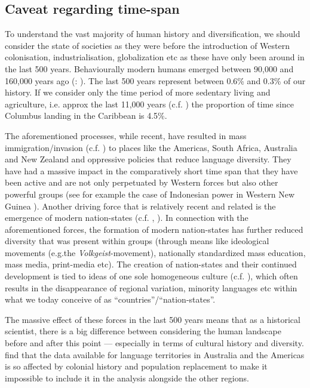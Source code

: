 \documentclass[12pt,letterpaper]{article}
\begin{document}
\newpage
\subsection{Caveat regarding time-span}
\label{appendix_time_span}

To understand the vast majority of human history and diversification, we should consider the state of societies as they were before the introduction of Western colonisation, industrialisation, globalization etc as these have only been around in the last 500 years. Behaviourally modern humans emerged between 90,000 and 160,000 years ago (\citet{powell2009late}: \cite{marean2007early}). The last 500 years represent between 0.6\% and 0.3\% of our history. If we consider only the time period of more sedentary living and agriculture, i.e. approx the last 11,000 years (c.f. \citet{kislev2006early}) the proportion of time since Columbus landing in the Caribbean is 4.5\%.

The aforementioned processes, while recent, have resulted in mass immigration/invasion (c.f. \citet{invasion_day}) to places like the Americas, South Africa, Australia and New Zealand and oppressive policies that reduce language diversity. They have had a massive impact in the comparatively short time span that they have been active and are not only perpetuated by Western forces but also other powerful groups (see for example the case of Indonesian power in Western New Guinea \citep{gietzelt1989indonesianization}). Another driving force that is relatively recent and related is the emergence of modern nation-states (c.f. \citet{foucault2007security}, \citet[21-22]{oakes2001language}). In connection with the aforementioned forces, the formation of modern nation-states has further reduced diversity that was present within groups (through means like ideological movements (e.g.the \emph{Volkgeist}-movement), nationally standardized mass education, mass media, print-media etc). The creation of nation-states and their continued development is tied to ideas of one sole homogeneous culture (c.f. \citet{encyclo_nationalism}), which often results in the disappearance of regional variation, minority languages etc within what we today conceive of as ``countries''/``nation-states''. 

The massive effect of these forces in the last 500 years means that as a historical scientist, there is a big difference between considering the human landscape before and after this point --- especially in terms of cultural history and diversity. \citet[7340-7341]{curriemace2009} find that the data available for language territories in Australia and the Americas is so affected by colonial history and population replacement to make it impossible to include it in the analysis alongside the other regions. 
\end{document}
